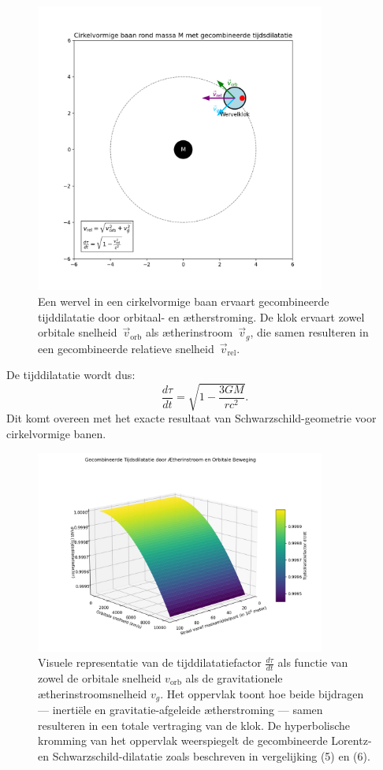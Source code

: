 \begin{figure}[htbp]
    \centering
    \includegraphics[width=0.85\textwidth]{08-BaanRondMassa_nl}
    \caption{Een wervel in een cirkelvormige baan ervaart gecombineerde tijddilatatie door orbitaal- en ætherstroming. De klok ervaart zowel orbitale snelheid~$\vec{v}_{\mathrm{orb}}$ als ætherinstroom~$\vec{v}_g$, die samen resulteren in een gecombineerde relatieve snelheid~$\vec{v}_{\mathrm{rel}}$.}
    \label{fig:BaanRondMassa}
\end{figure}

De tijddilatatie wordt dus:
\[
    \frac{d\tau}{dt} = \sqrt{1 - \frac{3GM}{rc^2}}. \tag{6}
\]
Dit komt overeen met het exacte resultaat van Schwarzschild-geometrie voor cirkelvormige banen.

\begin{figure}[htbp]
    \centering
    \includegraphics[width=0.85\textwidth]{09-CombinedTimeDilationSurface_nl}
    \caption{Visuele representatie van de tijddilatatiefactor \( \frac{d\tau}{dt} \) als functie van zowel de orbitale snelheid \( v_\text{orb} \) als de gravitationele ætherinstroomsnelheid \( v_g \). Het oppervlak toont hoe beide bijdragen — inertiële en gravitatie-afgeleide ætherstroming — samen resulteren in een totale vertraging van de klok. De hyperbolische kromming van het oppervlak weerspiegelt de gecombineerde Lorentz- en Schwarzschild-dilatatie zoals beschreven in vergelijking (5) en (6).}
    \label{fig:TimeDialationCombined}
\end{figure}

